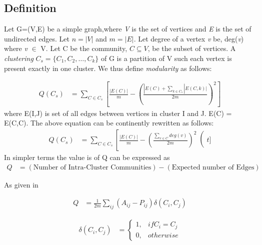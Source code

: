 \subsection{Definition}
Let G=(V,E) be a simple graph,where \textit{V} is the set of vertices and \textit{E} is the set of undirected edges. Let $n=|V|$ and $m=|E|$. Let degree of a vertex \textit{v} be, deg(\textit{v}) where \textit{v} $\in$ V. Let C be the community, $C \subseteq V$, be the subset of vertices. A \textit{clustering} $C_s =\{C_1,C_2, \ldots, C_k\}$ of G is a partition of V such each vertex is present exactly in one cluster.  We thus define \textit{modularity } as follows: \cite{modularityNP}

\begin{equation} \label{eq1}
\begin{split}
Q(C_s) &= \sum_{C \in C_s}\left[ \frac{|E(C)|}{m} - \left( \frac{|E(C)+\sum_{k \in C_s}|E(C,k)|}{2m} \right)^2 \right]
\end{split}
\end{equation}
where E(I,J) is set of all edges between vertices in cluster I and J. E(C) = E(C,C).
The above equation can be continently rewritten as follows: 
\begin{equation} \label{eq1}
\begin{split}
Q(C_s) &= \sum_{C \in C_s}\left[ \frac{|E(C)|}{m} - \left( \frac{\sum_{v \in C}deg(v)}{2m} \right)^2 \right(t]
\end{split}
\end{equation}
In simpler terms the value is of Q can be expressed as 
\begin{equation} \label{eq1}
\begin{split}
Q &= \left( \text{Number of Intra-Cluster Communities} \right) - (\text{Expected number of Edges})
\end{split}
\end{equation}

As given in \cite{Louvain}

\begin{equation}
    \begin{split}
Q &= \frac{1}{2m} \sum_{ij} \left(A_{ij} - P_{ij}\right) \delta(C_i,C_j)
\end{split}
    \end{equation}

\begin{equation}
\begin{split}
\delta(C_i,C_j) &= \begin{cases} 1 ,& if C_i = C_j \\
 0,& otherwise
 \end{cases}
\end{split}
\end{equation}

